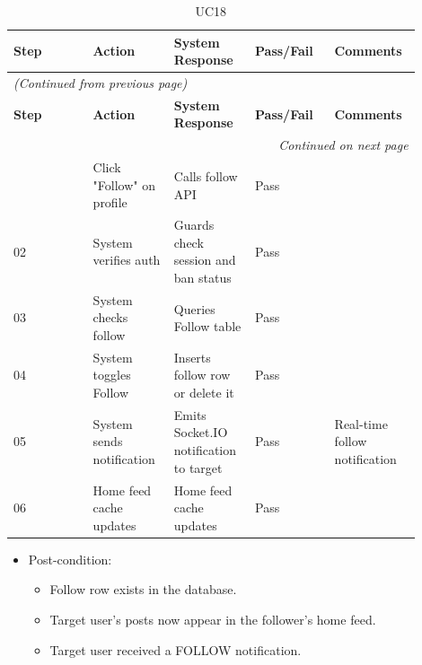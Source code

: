 \begin{longtable}{|p{0.18\linewidth}|p{0.18\linewidth}|p{0.18\linewidth}|p{0.18\linewidth}|p{0.18\linewidth}|}
\caption{UC18} \label{tab:36} \\
\hline
\textbf{Step} & \textbf{Action} & \textbf{System Response} & \textbf{Pass/Fail} & \textbf{Comments} \\
\hline
\endfirsthead
\multicolumn{5}{l}{\textit{(Continued from previous page)}} \\
\hline
\textbf{Step} & \textbf{Action} & \textbf{System Response} & \textbf{Pass/Fail} & \textbf{Comments} \\
\hline
\endhead
\hline \multicolumn{5}{r}{\textit{Continued on next page}} \\
\endfoot
\hline
\endlastfoot
01 & Click "Follow" on profile & Calls follow API & Pass &  \\
\hline
02 & System verifies auth & Guards check session and ban status & Pass &  \\
\hline
03 & System checks follow & Queries Follow table & Pass &  \\
\hline
04 & System toggles Follow & Inserts follow row or delete it & Pass &  \\
\hline
05 & System sends notification & Emits Socket.IO notification to target & Pass & Real-time follow notification \\
\hline
06 & Home feed cache updates & Home feed cache updates & Pass &  \\
\hline
\end{longtable}

\begin{itemize}
  \item Post-condition:
\begin{itemize}
  \item Follow row exists in the database.
  \item Target user's posts now appear in the follower's home feed.
  \item Target user received a FOLLOW notification.
\end{itemize}
\end{itemize}

